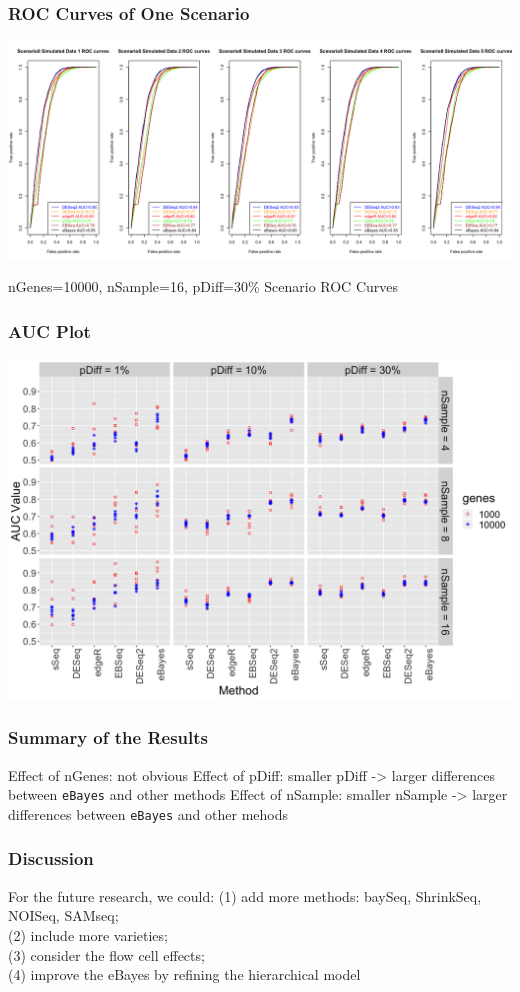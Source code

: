 \documentclass[handout,10pt]{beamer}
\begin{document}
\begin{frame}
\frametitle{ROC Curves of One Scenario}

\begin{center}
\includegraphics{sc8_roc}
\end{center}
nGenes=10000, nSample=16, pDiff=30\% Scenario ROC Curves

\end{frame}



\begin{frame}

\frametitle{AUC Plot}
\begin{center}
\includegraphics{auc_plot}
\end{center}

\end{frame}


\begin{frame}
\frametitle{Summary of the Results}


Effect of nGenes: not obvious
\newline
\newline
Effect of pDiff: smaller pDiff -> larger differences between {\tt eBayes} and other methods
\newline
\newline
Effect of nSample: smaller nSample -> larger differences between {\tt eBayes} and other mehods



\end{frame}

\begin{frame}
\frametitle{Discussion}

For the future research, we could:
\newline
(1) add more methods: baySeq, ShrinkSeq, NOISeq, SAMseq;\\
(2) include more varieties;\\
(3) consider the flow cell effects;\\
(4) improve the eBayes by refining the hierarchical model

\end{frame}
\end{document}
